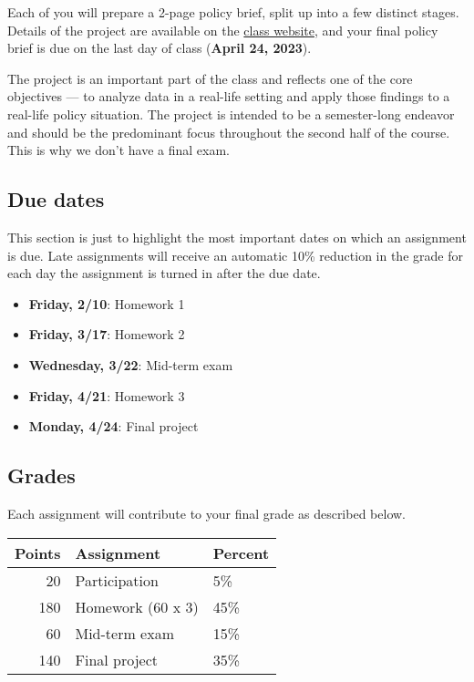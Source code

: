 \documentclass[11pt,]{article}
\providecommand{\tightlist}{%
  \setlength{\itemsep}{0pt}\setlength{\parskip}{0pt}}
\begin{document}
Each of you will prepare a 2-page policy brief, split up into a few
distinct stages. Details of the project are available on the
\href{https://econ372s23.classes.ianmccarthyecon.com/}{class website},
and your final policy brief is due on the last day of class
(\textbf{April 24, 2023}).

The project is an important part of the class and reflects one of the
core objectives --- to analyze data in a real-life setting and apply
those findings to a real-life policy situation. The project is intended
to be a semester-long endeavor and should be the predominant focus
throughout the second half of the course. This is why we don't have a
final exam.

\hypertarget{due-dates}{%
\subsection{Due dates}\label{due-dates}}

This section is just to highlight the most important dates on which an
assignment is due. Late assignments will receive an automatic 10\%
reduction in the grade for each day the assignment is turned in after
the due date.

\begin{itemize}
\tightlist
\item
  \textbf{Friday, 2/10}: Homework 1
\item
  \textbf{Friday, 3/17}: Homework 2
\item
  \textbf{Wednesday, 3/22}: Mid-term exam
\item
  \textbf{Friday, 4/21}: Homework 3
\item
  \textbf{Monday, 4/24}: Final project
\end{itemize}

\hypertarget{grades}{%
\subsection{Grades}\label{grades}}

Each assignment will contribute to your final grade as described below.

\begin{longtable}[]{@{}rll@{}}
\toprule()
Points & Assignment & Percent \\
\midrule()
\endhead
20 & Participation & 5\% \\
180 & Homework (60 x 3) & 45\% \\
60 & Mid-term exam & 15\% \\
140 & Final project & 35\% \\
\bottomrule()
\end{longtable}
\end{document}
